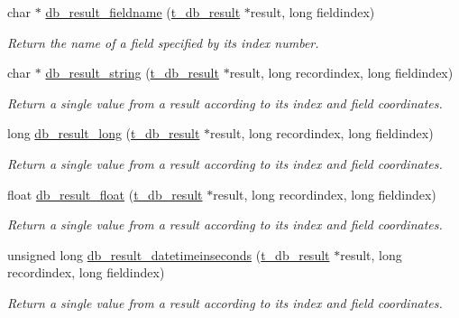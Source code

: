 \begin{DoxyCompactItemize}
char $\ast$ \hyperlink{group__database_ga7a9cc6a72ef3730979d0d909421076b3}{db\_\-result\_\-fieldname} (\hyperlink{structt__object}{t\_\-db\_\-result} $\ast$result, long fieldindex)
\begin{DoxyCompactList}\small\item\em Return the name of a field specified by its index number. \item\end{DoxyCompactList}\item 
char $\ast$ \hyperlink{group__database_ga57619b568083f0cf5989455af0ad3d5b}{db\_\-result\_\-string} (\hyperlink{structt__object}{t\_\-db\_\-result} $\ast$result, long recordindex, long fieldindex)
\begin{DoxyCompactList}\small\item\em Return a single value from a result according to its index and field coordinates. \item\end{DoxyCompactList}\item 
long \hyperlink{group__database_gadd498a9d44bc669bd544c781c1401e81}{db\_\-result\_\-long} (\hyperlink{structt__object}{t\_\-db\_\-result} $\ast$result, long recordindex, long fieldindex)
\begin{DoxyCompactList}\small\item\em Return a single value from a result according to its index and field coordinates. \item\end{DoxyCompactList}\item 
float \hyperlink{group__database_ga0558fcd917d24cc590ec0f426bf6bd7a}{db\_\-result\_\-float} (\hyperlink{structt__object}{t\_\-db\_\-result} $\ast$result, long recordindex, long fieldindex)
\begin{DoxyCompactList}\small\item\em Return a single value from a result according to its index and field coordinates. \item\end{DoxyCompactList}\item 
unsigned long \hyperlink{group__database_ga16ce6b68722eb623d9207b630e55b09a}{db\_\-result\_\-datetimeinseconds} (\hyperlink{structt__object}{t\_\-db\_\-result} $\ast$result, long recordindex, long fieldindex)
\begin{DoxyCompactList}\small\item\em Return a single value from a result according to its index and field coordinates. \item\end{DoxyCompactList}\item 

\end{DoxyCompactItemize}

